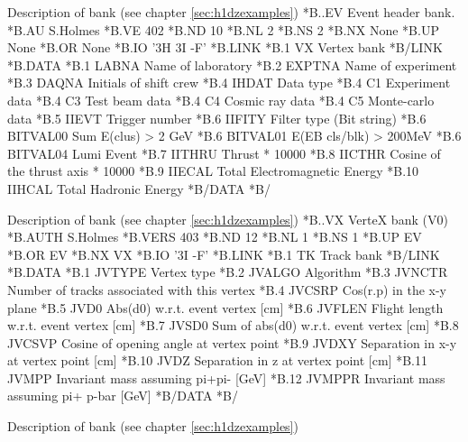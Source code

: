 \begin{landscapebody}
\NODOC{\begin{minipage}[t]{.49\hsize}}
\begin{XMPt}{Description of  bank (see chapter \ref{sec:h1dzexamples})}
*B..EV  Event header bank.
*B.AU    S.Holmes
*B.VE    402
*B.ND    10
*B.NL    2
*B.NS    2
*B.NX    None
*B.UP    None
*B.OR    None
*B.IO    '3H 3I -F'
*B.LINK
*B.1   VX       Vertex bank
*B/LINK
*B.DATA
*B.1   LABNA     Name of laboratory
*B.2   EXPTNA    Name of experiment
*B.3   DAQNA     Initials of shift crew 
*B.4   IHDAT     Data type
*B.4   C1        Experiment data
*B.4   C3        Test beam data
*B.4   C4        Cosmic ray data
*B.4   C5        Monte-carlo data
*B.5   IIEVT     Trigger number
*B.6   IIFITY    Filter type (Bit string)
*B.6   BITVAL00  Sum E(clus) > 2 GeV
*B.6   BITVAL01  E(EB cls/blk) > 200MeV
*B.6   BITVAL04  Lumi Event
*B.7   IITHRU    Thrust * 10000
*B.8   IICTHR    Cosine of the thrust axis * 10000
*B.9   IIECAL    Total Electromagnetic Energy
*B.10  IIHCAL    Total Hadronic Energy
*B/DATA
*B/
\end{XMPt}
\NODOC{\end{minipage}
\hspace*{2mm}
\begin{minipage}[t]{.49\hsize}}
\begin{XMPt}{Description of  bank (see chapter \ref{sec:h1dzexamples})}
*B..VX     VerteX bank (V0)
*B.AUTH    S.Holmes 
*B.VERS    403
*B.ND      12
*B.NL      1
*B.NS      1
*B.UP      EV
*B.OR      EV
*B.NX      VX
*B.IO      '3I -F'
*B.LINK
*B.1   TK       Track bank
*B/LINK
*B.DATA
*B.1   JVTYPE   Vertex type
*B.2   JVALGO   Algorithm
*B.3   JVNCTR   Number of tracks associated with this vertex
*B.4   JVCSRP   Cos(r.p) in the x-y plane
*B.5   JVD0     Abs(d0) w.r.t. event vertex            [cm]
*B.6   JVFLEN   Flight length w.r.t. event vertex      [cm]
*B.7   JVSD0    Sum of abs(d0) w.r.t. event vertex     [cm]
*B.8   JVCSVP   Cosine of opening angle at vertex point
*B.9   JVDXY    Separation in x-y at vertex point      [cm]
*B.10  JVDZ     Separation in z at vertex point        [cm]
*B.11  JVMPP    Invariant mass assuming pi+pi-        [GeV]
*B.12  JVMPPR   Invariant mass assuming pi+ p-bar     [GeV]
*B/DATA
*B/
\end{XMPt}
\NODOC{\end{minipage}}
\newpage
\NODOC{\begin{minipage}[t]{.49\hsize}}
\begin{XMPt}{Description of  bank (see chapter \ref{sec:h1dzexamples})}

\end{XMPt}
\end{landscapebody}
